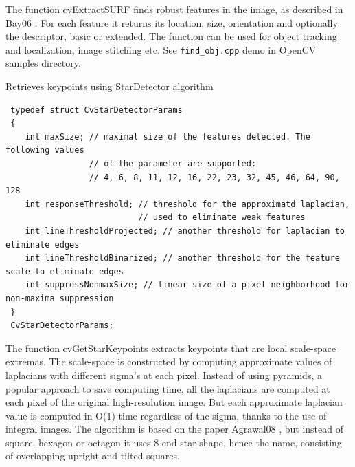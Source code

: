 The function cvExtractSURF finds robust features in the image, as
described in
Bay06
. For each feature it returns its location, size,
orientation and optionally the descriptor, basic or extended. The function
can be used for object tracking and localization, image stitching etc. See
\texttt{find\_obj.cpp} demo in OpenCV samples directory.

\label{GetStarKeypoints}

Retrieves keypoints using StarDetector algorithm


\begin{description}
\begin{lstlisting}
 typedef struct CvStarDetectorParams
 {
    int maxSize; // maximal size of the features detected. The following values
                 // of the parameter are supported:
                 // 4, 6, 8, 11, 12, 16, 22, 23, 32, 45, 46, 64, 90, 128
    int responseThreshold; // threshold for the approximatd laplacian,
                           // used to eliminate weak features
    int lineThresholdProjected; // another threshold for laplacian to eliminate edges
    int lineThresholdBinarized; // another threshold for the feature scale to eliminate edges
    int suppressNonmaxSize; // linear size of a pixel neighborhood for non-maxima suppression
 }
 CvStarDetectorParams;
\end{lstlisting}
\end{description}

The function cvGetStarKeypoints extracts keypoints that are local
scale-space extremas. The scale-space is constructed by computing
approximate values of laplacians with different sigma's at each
pixel. Instead of using pyramids, a popular approach to save computing
time, all the laplacians are computed at each pixel of the original
high-resolution image. But each approximate laplacian value is computed
in O(1) time regardless of the sigma, thanks to the use of integral
images. The algorithm is based on the paper 
Agrawal08
, but instead
of square, hexagon or octagon it uses 8-end star shape, hence the name,
consisting of overlapping upright and tilted squares.


